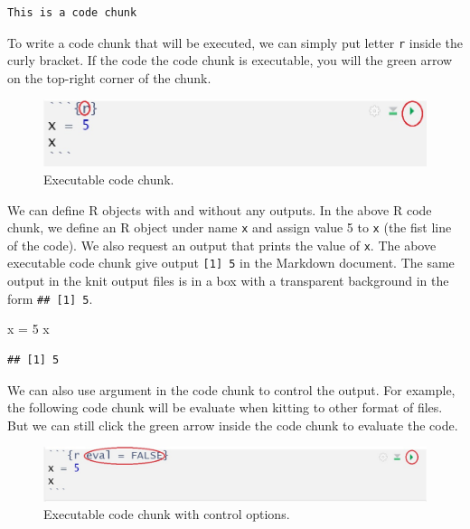 \documentclass[
]{article}
\newenvironment{Shaded}{\begin{snugshade}}{\end{snugshade}}
\newcommand{\DecValTok}[1]{\textcolor[rgb]{0.00,0.00,0.81}{#1}}
\newcommand{\NormalTok}[1]{#1}
\newcommand{\StringTok}[1]{\textcolor[rgb]{0.31,0.60,0.02}{#1}}
\begin{document}
\begin{verbatim}
This is a code chunk
\end{verbatim}

To write a code chunk that will be executed, we can simply put letter
\texttt{r} inside the curly bracket. If the code the code chunk is
executable, you will the green arrow on the top-right corner of the
chunk.

\begin{figure}

{\centering \includegraphics[width=12.19in]{Executable-code-chunk} 

}

\caption{Executable code chunk.}\label{fig:unnamed-chunk-4}
\end{figure}

We can define R objects with and without any outputs. In the above R
code chunk, we define an R object under name \texttt{x} and assign value
5 to \texttt{x} (the fist line of the code). We also request an output
that prints the value of \texttt{x}. The above executable code chunk
give output \texttt{{[}1{]}\ 5} in the Markdown document. The same
output in the knit output files is in a box with a transparent
background in the form \texttt{\#\#\ {[}1{]}\ 5}.

\begin{Shaded}
\begin{Highlighting}[]
\NormalTok{x =}\StringTok{ }\DecValTok{5}
\NormalTok{x}
\end{Highlighting}
\end{Shaded}

\begin{verbatim}
## [1] 5
\end{verbatim}

We can also use argument in the code chunk to control the output. For
example, the following code chunk will be evaluate when kitting to other
format of files. But we can still click the green arrow inside the code
chunk to evaluate the code.

\begin{figure}

{\centering \includegraphics[width=16.07in]{Executable-code-chunk-argument} 

}

\caption{Executable code chunk with control options.}\label{fig:unnamed-chunk-6}
\end{figure}
\end{document}
